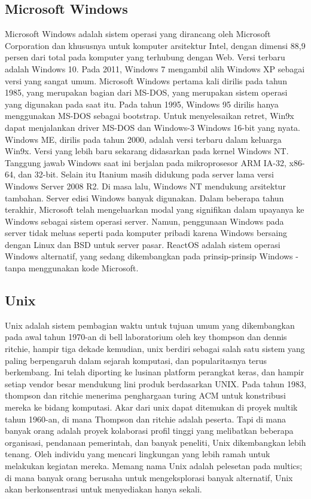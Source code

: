 \subsection{Microsoft Windows}
	\begin{enumerate}
		Microsoft Windows adalah sistem operasi yang dirancang oleh Microsoft Corporation dan khususnya untuk komputer arsitektur Intel, dengan dimensi 88,9 persen dari total pada komputer yang terhubung dengan Web. Versi terbaru adalah Windows 10.
		Pada 2011, Windows 7 mengambil alih Windows XP sebagai versi yang sangat umum. Microsoft Windows pertama kali dirilis pada tahun 1985, yang merupakan bagian dari MS-DOS, yang merupakan sistem operasi yang digunakan pada saat itu. Pada tahun 1995, Windows 95 dirilis hanya menggunakan MS-DOS sebagai bootstrap. Untuk menyelesaikan retret, Win9x dapat menjalankan driver MS-DOS dan Windows-3 Windows 16-bit yang nyata. Windows ME, dirilis pada tahun 2000, adalah versi terbaru dalam keluarga Win9x. Versi yang lebih baru sekarang didasarkan pada kernel Windows NT. Tanggung jawab Windows saat ini berjalan pada mikroprosesor ARM IA-32, x86-64, dan 32-bit. Selain itu Itanium masih didukung pada server lama versi Windows Server 2008 R2. Di masa lalu, Windows NT mendukung arsitektur tambahan. Server edisi Windows banyak digunakan. Dalam beberapa tahun terakhir, Microsoft telah mengeluarkan modal yang signifikan dalam upayanya ke Windows sebagai sistem operasi server. Namun, penggunaan Windows pada server tidak meluas seperti pada komputer pribadi karena Windows bersaing dengan Linux dan BSD untuk server pasar. ReactOS adalah sistem operasi Windows alternatif, yang sedang dikembangkan pada prinsip-prinsip Windows - tanpa menggunakan kode Microsoft.
	\end{enumerate}
\subsection{Unix}
	\begin{enumerate}
		Unix adalah sistem pembagian waktu untuk tujuan umum yang dikembangkan pada awal tahun 1970-an di bell laboratorium oleh key thompson dan dennis ritchie, hampir tiga dekade kemudian, unix berdiri sebagai salah satu sistem yang paling berpengaruh dalam sejarah komputasi, dan popularitasnya terus berkembang. Ini telah diporting ke lusinan platform perangkat keras, dan hampir setiap vendor besar mendukung lini produk berdasarkan UNIX. Pada tahun 1983, thompson dan ritchie menerima penghargaan turing ACM untuk konstribusi mereka ke bidang komputasi.
		Akar dari unix dapat ditemukan di proyek multik tahun 1960-an, di mana Thompson dan ritchie adalah peserta. Tapi di mana banyak orang adalah proyek kolaborasi profil tinggi yang melibatkan beberapa organisasi, pendanaan pemerintah, dan banyak peneliti, Unix dikembangkan lebih tenang. Oleh individu yang mencari lingkungan yang lebih ramah untuk melakukan kegiatan mereka. Memang nama Unix adalah pelesetan pada multics; di mana banyak orang berusaha untuk mengeksplorasi banyak alternatif, Unix akan berkonsentrasi untuk menyediakan hanya sekali.
	\end{enumerate}
	
\cite{silberschatz2014operating}
\cite{hoare1974monitors}
\cite{bach1986design}
\cite{love2005linux}
\cite{kukreja2006rui}
\cite{mckeown2009software}
\cite{russinovich2005microsoft}
\cite{van1994treecon}
\cite{mckusick1985performance}
\cite{higgins1988clustal}
\cite{narten2003unix}